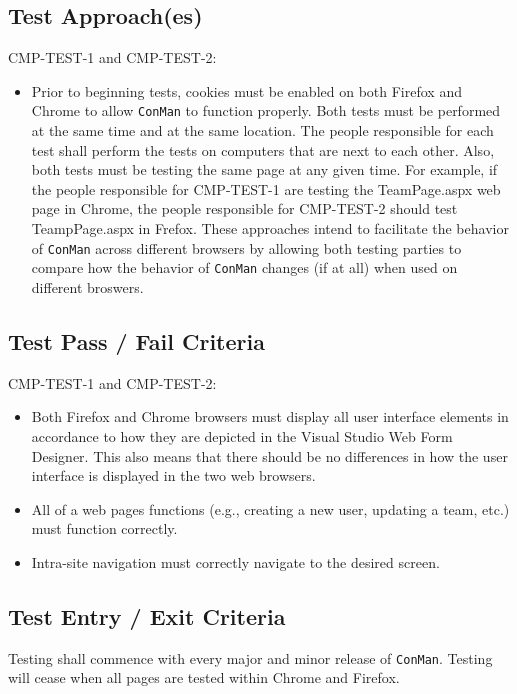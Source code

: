 \documentclass{article}
\begin{document}
\subsection{Test Approach(es)}
CMP-TEST-1 and CMP-TEST-2:
\begin{itemize}
\item Prior to beginning tests, cookies must be enabled on both Firefox and Chrome 
to allow \texttt{ConMan} to function properly.\newline \newline
Both tests must be performed at the same time and at the same location. 
The people responsible for each test shall perform the tests on computers that 
are next to each other. Also, both tests must be testing the same page at any given 
time. For example, if the people responsible for CMP-TEST-1 are testing the 
TeamPage.aspx web page in Chrome, the people responsible for CMP-TEST-2 should test 
TeampPage.aspx in Frefox.\newline \newline
	These approaches intend to facilitate the behavior of \texttt{ConMan} across 
different browsers by allowing both testing parties to compare how the behavior 
of \texttt{ConMan} changes (if at all) when used on different broswers.
\end{itemize}


\subsection{Test Pass / Fail Criteria}
CMP-TEST-1 and CMP-TEST-2:
\begin{itemize}
\item Both Firefox and Chrome browsers must display all user interface elements 
in accordance to how they are depicted in the Visual Studio Web Form Designer. This 
also means that there should be no differences in how the user interface is displayed 
in the two web browsers.
\item All of a web pages functions (e.g., creating a new user, updating a team, etc.) must 
function correctly.
\item Intra-site navigation must correctly navigate to the desired screen.
\end{itemize}

\subsection{Test Entry / Exit Criteria}
Testing shall commence with every major and minor release of \texttt{ConMan}. Testing 
will cease when all pages are tested within Chrome and Firefox.
\end{document}
